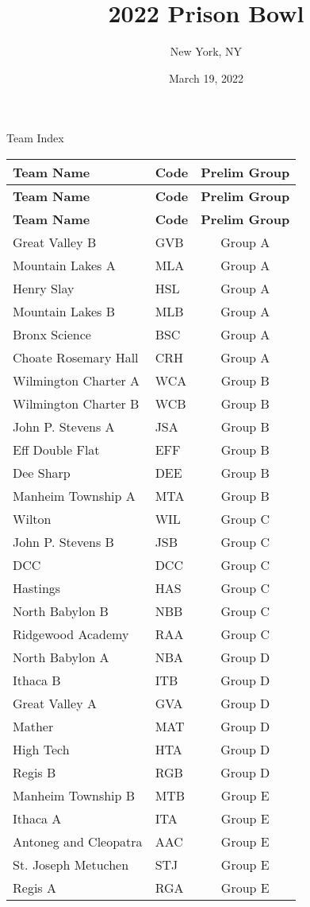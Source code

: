 \documentclass{article}%
\title{2022 Prison Bowl}%
\author{New York, NY}%
\date{March 19, 2022}%
\begin{document}
%
\normalsize%
%
\maketitle%
\vspace*{48pt}%
\begin{center}%
\begin{Huge}%
Team Index%
\end{Huge}%
\end{center}%
\newpage%
\pagestyle{fancy}%
\fancyhf{}%
%
%
%
%
%
\begin{longtable}{|ll|c|}%
\rowcolor{gray!30}%
\hline%
\textbf{Team Name} & \textbf{Code}&\textbf{Prelim Group}\\%
\hline%
\endhead%
\hline%
\rowcolor{gray!25}%
\textbf{Team Name} & \textbf{Code}&\textbf{Prelim Group}\\%
\hline%
\endfoot%
\hline%
\hline\rowcolor{gray!25}%
\textbf{Team Name} & \textbf{Code}&\textbf{Prelim Group}\\%
\hline%
\endlastfoot%
\hline%
Great Valley B&GVB&Group A\\%
Mountain Lakes A&MLA&Group A\\%
Henry Slay&HSL&Group A\\%
Mountain Lakes B&MLB&Group A\\%
Bronx Science&BSC&Group A\\%
Choate Rosemary Hall&CRH&Group A\\%
Wilmington Charter A&WCA&Group B\\%
Wilmington Charter B&WCB&Group B\\%
John P. Stevens A&JSA&Group B\\%
Eff Double Flat&EFF&Group B\\%
Dee Sharp&DEE&Group B\\%
Manheim Township A&MTA&Group B\\%
Wilton&WIL&Group C\\%
John P. Stevens B&JSB&Group C\\%
DCC&DCC&Group C\\%
Hastings&HAS&Group C\\%
North Babylon B&NBB&Group C\\%
Ridgewood Academy&RAA&Group C\\%
North Babylon A&NBA&Group D\\%
Ithaca B&ITB&Group D\\%
Great Valley A&GVA&Group D\\%
Mather&MAT&Group D\\%
High Tech&HTA&Group D\\%
Regis B&RGB&Group D\\%
Manheim Township B&MTB&Group E\\%
Ithaca A&ITA&Group E\\%
Antoneg and Cleopatra&AAC&Group E\\%
St. Joseph Metuchen&STJ&Group E\\%
Regis A&RGA&Group E\\%
\end{longtable}%
\end{document}
